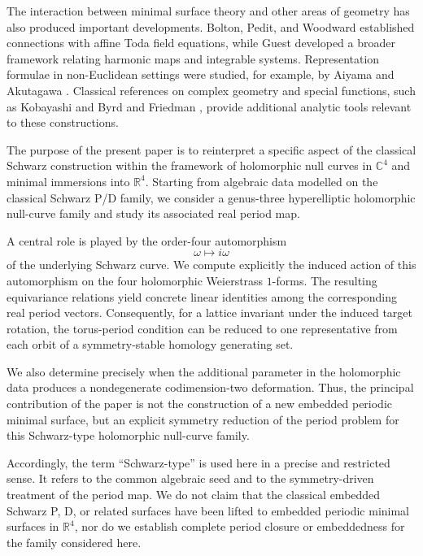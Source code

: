 \documentclass[12pt]{article}
\numberwithin{equation}{section}
\theoremstyle{definition}
\theoremstyle{remark}
\begin{document}
The interaction between minimal surface theory and other areas of
geometry has also produced important developments. Bolton, Pedit, and
Woodward \cite{BoltonPeditWoodward} established connections with affine
Toda field equations, while Guest \cite{Guest} developed a broader
framework relating harmonic maps and integrable systems. Representation
formulae in non-Euclidean settings were studied, for example, by
Aiyama and Akutagawa \cite{AiyamaAkutagawa}. Classical references on
complex geometry and special functions, such as Kobayashi
\cite{Kobayashi} and Byrd and Friedman \cite{ByrdFriedman}, provide
additional analytic tools relevant to these constructions.

The purpose of the present paper is to reinterpret a specific aspect of
the classical Schwarz construction within the framework of holomorphic
null curves in $\mathbb{C}^4$ and minimal immersions into
$\mathbb{R}^4$. Starting from algebraic data modelled on the classical
Schwarz P/D family, we consider a genus-three hyperelliptic
holomorphic null-curve family and study its associated real period map.

A central role is played by the order-four automorphism
\[
\omega\longmapsto i\omega
\]
of the underlying Schwarz curve. We compute explicitly the induced
action of this automorphism on the four holomorphic Weierstrass
$1$-forms. The resulting equivariance relations yield concrete linear
identities among the corresponding real period vectors. Consequently,
for a lattice invariant under the induced target rotation, the
torus-period condition can be reduced to one representative from each
orbit of a symmetry-stable homology generating set.

We also determine precisely when the additional parameter in the
holomorphic data produces a nondegenerate codimension-two deformation.
Thus, the principal contribution of the paper is not the construction
of a new embedded periodic minimal surface, but an explicit
symmetry reduction of the period problem for this Schwarz-type
holomorphic null-curve family.

Accordingly, the term ``Schwarz-type'' is used here in a precise and
restricted sense. It refers to the common algebraic seed and to the
symmetry-driven treatment of the period map. We do not claim that the
classical embedded Schwarz P, D, or related surfaces have been lifted
to embedded periodic minimal surfaces in $\mathbb{R}^4$, nor do we
establish complete period closure or embeddedness for the family
considered here.
\end{document}
